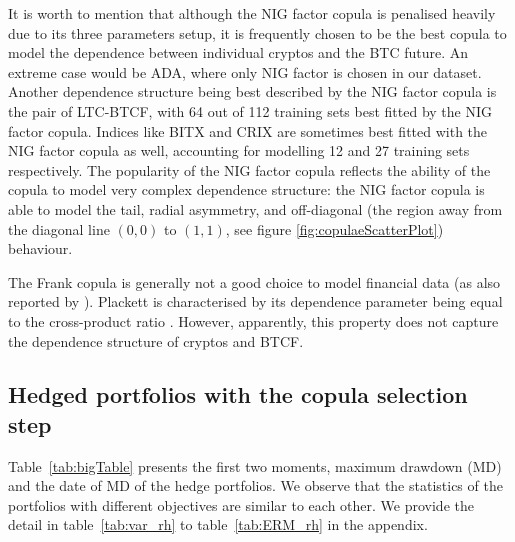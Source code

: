 It is worth to mention that although the NIG factor copula is penalised heavily due to its three parameters setup,
it is frequently chosen to be the best copula to model the dependence
between individual cryptos and the BTC future.
An extreme case would be ADA, where only NIG factor is chosen in our dataset.
Another dependence structure being best described by the NIG factor
copula is the pair of LTC-BTCF, with
64 out of 112 training sets best fitted by the NIG factor copula.
Indices like BITX and CRIX are sometimes best fitted with the NIG
factor copula as well, accounting for modelling 12 and 27 training
sets respectively.
The popularity of the NIG factor copula reflects the ability of the copula to
model very complex dependence structure: the
NIG factor copula is able to model the tail, radial asymmetry, and
off-diagonal (the region away from the diagonal line $(0,0)$ to
$(1,1)$, see figure \ref{fig:copulaeScatterPlot}) behaviour. 
  


The Frank copula is generally not a good choice to model financial
data (as also reported by \cite{barbi2014copula}).
Plackett is characterised by its dependence parameter being equal to
the cross-product ratio %
. 
However, apparently, this property does not capture the dependence
structure of cryptos and BTCF.


\subsection{Hedged portfolios with the copula selection step}\label{subsec:HP2}
%    
Table~\ref{tab:bigTable} presents the first two moments, maximum drawdown (MD) and the date of MD of the hedge portfolios.
We observe that the statistics of the portfolios with different objectives are similar to each other.
We provide the detail in table~\ref{tab:var_rh} to table~\ref{tab:ERM_rh} in the appendix. \medskip

